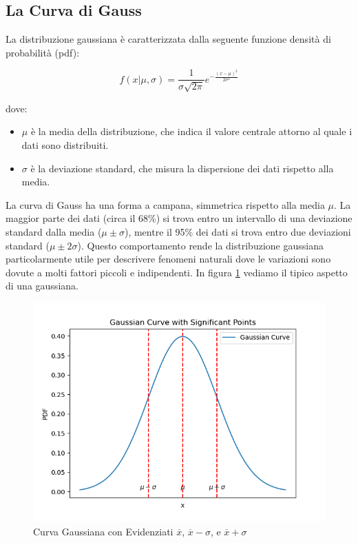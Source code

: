 \documentclass{article}
\begin{document}
\subsection{La Curva di Gauss}

La distribuzione gaussiana è caratterizzata dalla seguente funzione densità di probabilità (pdf):

\begin{equation}
f(x|\mu,\sigma) = \frac{1}{\sigma \sqrt{2\pi}} e^{-\frac{(x-\mu)^2}{2\sigma^2}}
\end{equation}

dove:
\begin{itemize}
    \item $\mu$ è la media della distribuzione, che indica il valore centrale attorno al quale i dati sono distribuiti.
    \item $\sigma$ è la deviazione standard, che misura la dispersione dei dati rispetto alla media.
\end{itemize}

La curva di Gauss ha una forma a campana, simmetrica rispetto alla media $\mu$. La maggior parte dei dati (circa il 68\%) si trova entro un intervallo di una deviazione standard dalla media ($\mu \pm \sigma$), mentre il 95\% dei dati si trova entro due deviazioni standard ($\mu \pm 2\sigma$). Questo comportamento rende la distribuzione gaussiana particolarmente utile per descrivere fenomeni naturali dove le variazioni sono dovute a molti fattori piccoli e indipendenti. In figura \ref{fig:curva_gaussiana} vediamo il tipico aspetto di una gaussiana.

\begin{figure}[h!]
    \centering
     \includegraphics[scale=0.7]{curva_gaussiana.png} 
    \caption{Curva Gaussiana con Evidenziati \(\overline{x}\), \(\overline{x} - \sigma\), e \(\overline{x} + \sigma\)}
    \label{fig:curva_gaussiana}
\end{figure}
\end{document}
